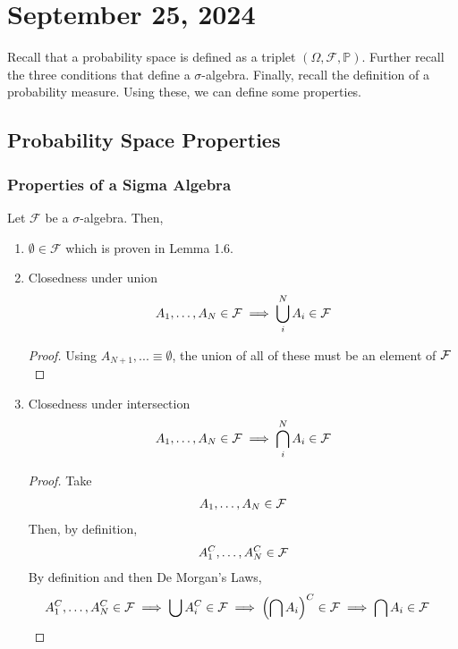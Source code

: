 \section{September 25, 2024}
Recall that a probability space is defined as a triplet $(\Omega, \mathcal{F}, \mathbb{P})$. Further recall the three conditions that define a $\sigma$-algebra. Finally, recall the definition of a probability measure. Using these, we can define some properties.

\subsection{Probability Space Properties}

\subsubsection{Properties of a Sigma Algebra}
Let $\mathcal{F}$ be a $\sigma$-algebra. Then,
\begin{enumerate}
    \item $\emptyset \in \mathcal{F}$ which is proven in Lemma 1.6.
    \item Closedness under union
    \begin{align}
        A_1, \ldots, A_N \in \mathcal{F} \implies \bigcup_i^N A_i \in \mathcal{F}
    \end{align}
    \begin{proof}
        Using $A_{N+1}, ... \equiv \emptyset$, the union of all of these must be an element of $\mathcal{F}$
    \end{proof}
    \item Closedness under intersection
    \begin{align}
        A_1, \ldots, A_N \in \mathcal{F} \implies \bigcap_i^N A_i \in \mathcal{F}
    \end{align}
    \begin{proof}
        Take
        \begin{align}
            A_1, \ldots, A_N \in \mathcal{F} 
        \end{align}
        Then, by definition,
        \begin{align}
            A_1^C, \ldots, A_N^C \in \mathcal{F} 
        \end{align}
        By definition and then De Morgan's Laws,
        \begin{align}
            A_1^C, \ldots, A_N^C \in \mathcal{F}  \implies  \bigcup A_i^C \in \mathcal{F} \implies \left( \bigcap A_i \right)^C \in \mathcal{F} \implies \bigcap A_i \in \mathcal{F} & \qedhere
        \end{align}
    \end{proof}
\end{enumerate}

